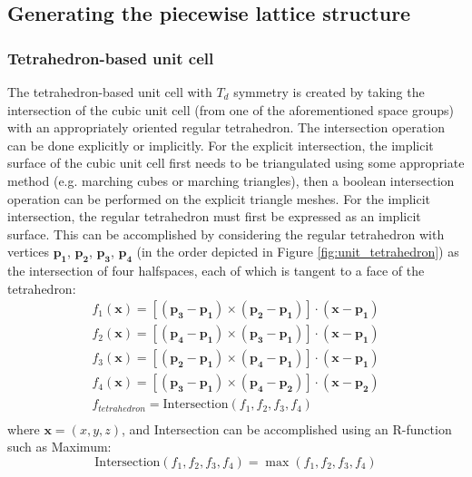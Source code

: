 \documentclass{article}
\begin{document}
\subsection{Generating the piecewise lattice structure}
\subsubsection{Tetrahedron-based unit cell}
The tetrahedron-based unit cell with $T_d$ symmetry is created by taking the intersection of the cubic unit cell (from one of the aforementioned space groups) with an appropriately oriented regular tetrahedron. The intersection operation can be done explicitly or implicitly. For the explicit intersection, the implicit surface of the cubic unit cell first needs to be triangulated using some appropriate method (e.g. marching cubes or marching triangles), then a boolean intersection operation can be performed on the explicit triangle meshes. For the implicit intersection, the regular tetrahedron must first be expressed as an implicit surface. This can be accomplished by considering the regular tetrahedron with vertices $\mathbf{p_1}$, $\mathbf{p_2}$, $\mathbf{p_3}$, $\mathbf{p_4}$ (in the order depicted in Figure \ref{fig:unit_tetrahedron}) as the intersection of four halfspaces, each of which is tangent to a face of the tetrahedron:
\begin{equation}
    \label{eq:implicit_tetrahedron}
    \begin{split}
        f_1(\mathbf{x}) = \left[ (\mathbf{p_3} - \mathbf{p_1})\times(\mathbf{p_2} - \mathbf{p_1}) \right] \cdot (\mathbf{x} - \mathbf{p_1}) \\
        f_2(\mathbf{x}) = \left[ (\mathbf{p_4} - \mathbf{p_1})\times(\mathbf{p_3} - \mathbf{p_1}) \right] \cdot (\mathbf{x} - \mathbf{p_1}) \\
        f_3(\mathbf{x}) = \left[ (\mathbf{p_2} - \mathbf{p_1})\times(\mathbf{p_4} - \mathbf{p_1}) \right] \cdot (\mathbf{x} - \mathbf{p_1}) \\
        f_4(\mathbf{x}) = \left[ (\mathbf{p_3} - \mathbf{p_1})\times(\mathbf{p_4} - \mathbf{p_2}) \right] \cdot (\mathbf{x} - \mathbf{p_2}) \\
        f_{tetrahedron} = \text{Intersection}(f_1, f_2, f_3, f_4) \\
    \end{split}
\end{equation}
where $\mathbf{x} = (x, y, z)$, and Intersection can be accomplished using an R-function such as Maximum: 
\begin{equation}
    \text{Intersection}(f_1, f_2, f_3, f_4) = \max(f_1, f_2, f_3, f_4)
\end{equation}
\end{document}
